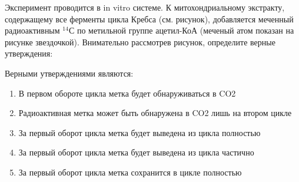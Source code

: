 
Эксперимент проводится в in vitro системе. К митохондриальному экстракту, содержащему все ферменты цикла
Кребса (см. рисунок),  добавляется
меченный радиоактивным $^{14}$С по метильной группе ацетил-КоА (меченый
атом показан на рисунке звездочкой). Внимательно рассмотрев рисунок, определите верные утверждения:


Верными утверждениями являются:

\begin{enumerate}
    \item В первом обороте цикла метка будет обнаруживаться в CO2
    \item Радиоактивная метка может быть обнаружена в CO2 лишь на втором цикле
    \item За первый оборот цикла метка будет выведена из цикла полностью
    \item За первый оборот цикла метка будет выведена из цикла частично
    \item За первый оборот цикла метка сохранится в цикле полностью
\end{enumerate}

\explanationSection

